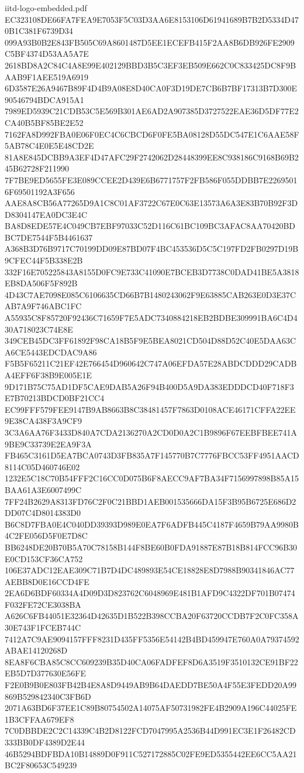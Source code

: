 \begin{filecontents*}[overwrite]{iitd-logo-embedded.pdf}
EC323108DE66FA7FEA9E7053F5C03D3AA6E8153106D61941689B7B2D5334D470B1C381F6739D34
099A93B0B2E843FB505C69A8601487D5EE1ECEFB415F2AA8B6DB926FE2909C5BF4374D53AA5A7E
2618BD8A2C84C4A8E99E402129BBD3B5C3EF3EB509E662C0C833425DC8F9BAAB9F1AEE519A6919
6D3587E26A9467B89F4D4B9A08E8D40CA0F3D19DE7CB6B7BF17313B7D300E90546794BDCA915A1
7989ED5939C21CDB53C5E569B301AE6AD2A907385D3727522EAE36D5DF77E2CA40B5BF85BE2E52
7162FA8D992FBA0E06F0EC4C6CBCD6F0FE5BA08128D55DC547E1C6AAE58F5AB78C4E0E5E48CD2E
81A8E845DCBB9A3EF4D47AFC29F2742062D28448399EE8C938186C9168B69B245B62728F211990
7F7BE9ED5655FE3E089CCEE2D439E6B6771757F2FB586F055DDBB7E22695016F69501192A3F656
AAE8A8CB56A77265D9A1C8C01AF3722C67E0C63E13573A6A3E83B70B92F3DD8304147EA0DC3E4C
BA8D8EDE57E4C049CB7EBF97033C52D116C61BC109BC3AFAC8AA70420BDBC7DE7544F5B4461637
A368B3D76B9717C70199DD09E87BD07F4BC453536D5C5C197FD2FB0297D19B9CFEC44F5B338E2B
332F16E705225843A8155D0FC9E733C41090E7BCEB3D7738C0DAD41BE5A3818EB8DA506F5F892B
4D43C7AE7098E085C6106635CD66B7B1480243062F9E63885CAB263E0D3E37CAB7A9F746ABC1FC
A55935C8F85720F92436C71659F7E5ADC7340884218EB2BDBE309991BA6C4D430A718023C74E8E
349CEB45DC3FF61892F98CA18B5F9E5BEA8021CD504D88D52C40E5DAA63CA6CE5443EDCDAC9A86
F5B5F65211C21EF42E766454D960642C747A06EFDA57E28ABDCDDD29CADBA4EFF6F38B9E005E1E
9D171B75C75AD1DF5CAE9DAB5A26F94B400D5A9DA383EDDDCD40F718F3E7B70213BDCD0BF21CC4
EC99FFF579FEE9147B9AB8663B8C38481457F7863D0108ACE46171CFFA22EE9E38CA438F3A9CF9
3C3A6AA76F3433D840A7CDA2136270A2CD0D0A2C1B9896F67EEBFBEE741A9BE9C33739E2EA9F3A
FB465C3161D5EA7BCA0743D3FB835A7F145770B7C7776FBCC53FF4951AACD8114C05D460746E02
1232E5C18C70B54FFF2C16CC0D075B6F8AECC9AF7BA34F7156997898B85A15BAA61A3E6007499C
7FF24B2629A8313FD76C2F0C21BBD1AEB001535666DA15F3B95B6725E686D2DD07C4D8014383D0
B6C8D7FBA0E4C040DD39393D989E0EA7F6ADFB445C4187F4659B79AA9980B4C2FE056D5F0E7D8C
BB6248DE20B70B5A70C78158B144F8BE60B0FDA91887E87B18B814FCC96B30E0CD153CF36CA752
106E37ADC12EAE309C71B7D4DC489893E54CE18828E8D7988B90341846AC77AEBB8D0E16CCD4FE
2EA6D6BDF60334A4D09D3D823762C6048969E481B1AFD9C4322DF701B07474F032FE72CE3038BA
A626C6FB44051E32364D42635D1B522B398CCBA20F63720CCDB7F2C0FC358A30E743F1FCEB744C
7412A7C9AE9094157FFF8231D435FF5356E54142B4BD459947E760A0A79374592ABAE14120268D
8EA8F6CBA85C8CC609239B35D40CA06FADFEF8D6A3519F3510132CE91BF22EB5D7D377630E56FE
F2E0B9B0E803FB42B4E8A8D9449AB9B64DAEDD7BE50A4F55E3FEDD20A99869B529842340C3FB6D
2071A63BD6F37EE1C89B80754502A14075AF50731982FE4B2909A196C44025FE1B3CFFAA679EF8
7C0DBBDE2C2C14339C4B2D8122FCD7047995A2536B44D991EC3E1F26482CD333BB0DF4389D2E44
46B5294BDFBDA10B14889D0F911C527172885C02FE9ED5355442EE6CC5AA21BC2F80653C549239

\end{filecontents*}
